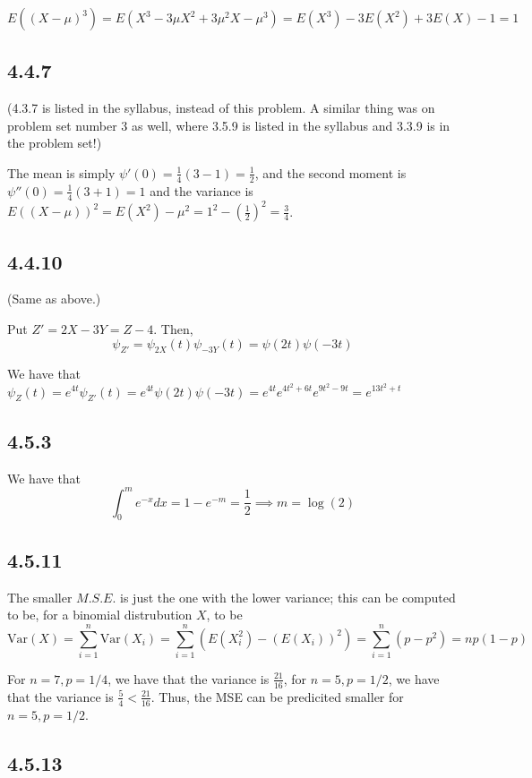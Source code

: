 \documentclass[12pt,letterpaper]{article}
\theoremstyle{definition}
\newcommand{\var}[1]{\text{Var}\left(#1\right)}
\begin{document}
\[
  E((X-\mu)^3) = E(X^3 - 3\mu X^2 + 3\mu^2X - \mu^3) = E(X^3) - 3E(X^2) + 3E(X)
  - 1 = 1
\]

\subsection*{4.4.7}

(4.3.7 is listed in the syllabus, instead of this problem. A similar thing was
on problem set number 3 as well, where 3.5.9 is listed in the syllabus and 3.3.9
is in the problem set!)

The mean is simply $\psi'(0) = \frac{1}{4}(3 - 1) = \frac{1}{2}$, and the second
moment is $\psi''(0) = \frac{1}{4}(3 + 1) = 1$ and the variance is $E((X - \mu))^2 = E(X^2) -
\mu^2 = 1^2 - (\frac{1}{2})^2 = \frac{3}{4}$.

\subsection*{4.4.10}

(Same as above.)

Put $Z' = 2X - 3Y = Z - 4$. Then,
\[
  \psi_{Z'} = \psi_{2X}(t)\psi_{-3Y}(t) = \psi(2t)\psi(-3t)
\]

We have that $\psi_Z(t) = e^{4t}\psi_{Z'}(t) = e^{4t}\psi(2t)\psi(-3t) =
e^{4t}e^{4t^2 + 6t}e^{9t^2-9t} = e^{13t^2+t}$

\subsection*{4.5.3}

We have that
\[
  \int_0^me^{-x}dx = 1 - e^{-m} = \frac{1}{2} \implies m = \log(2)
\]

\subsection*{4.5.11}

The smaller $M.S.E.$ is just the one with the lower variance; this can be
computed to be, for a binomial distrubution $X$, to be
\[
  \var{X} = \sum_{i=1}^n \var{X_i} = \sum_{i=1}^n (E(X_i^2) - (E(X_i))^2) =
  \sum_{i=1}^n(p - p^2) = np(1-p)
\]

For $n = 7, p = 1/4$, we have that the variance is $\frac{21}{16}$, for $n = 5, p
= 1/2$, we have that the variance is $\frac{5}{4} < \frac{21}{16}$. Thus, the
MSE can be predicited smaller for $n = 5, p = 1/2$.

\subsection*{4.5.13}
\end{document}

